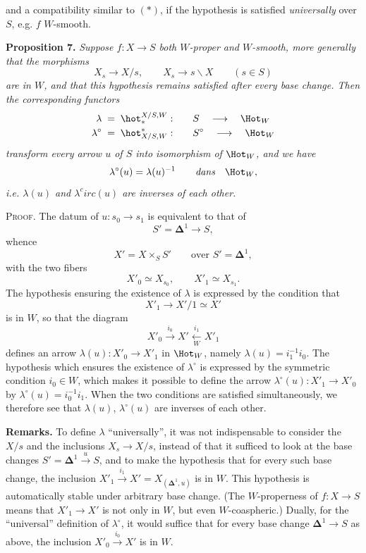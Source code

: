 \leavevmode{}and a compatibility similar to $(*)$, if the hypothesis is satisfied \textit{universally} over $S$, e.g. $f$ $W$-smooth.

\textbf{Proposition 7.} \textit{Suppose $f : X\longrightarrow S$ both $W$-proper and $W$-smooth, more generally that the morphisms}
\[
X_s\longrightarrow X/s,\qquad X_s\longrightarrow s\backslash X\qquad(s\in S)
\]
\textit{are in $W$, and that this hypothesis remains satisfied after every base change. Then the corresponding functors} %
\[
\begin{aligned}
\lambda &\;=\;\hot_*^{X/S,W} : &&\quad S \quad\longrightarrow\quad \Hot_W\\
\lambda^\circ &\;=\;\hot^*_{X/S,W} : &&\quad S^\circ \quad\longrightarrow\quad \Hot_W
\end{aligned}
\]
\textit{transform every arrow $u$ of $S$ into} \textit{isomorphism of} $\Hot_W$\textit{, and we have}
\[
\lambda^\circ(u)=\lambda(u)^{-1}\qquad\textit{dans}\quad\Hot_W,
\]
\textit{i.e. $\lambda(u)$ and $\lambda^c irc(u)$ are inverses of each other.} %

\textsc{Proof}. The datum of $u : s_0\longrightarrow s_1$ is equivalent to that of
\[
S'=\mathbf{\Delta}^1\longrightarrow S,
\]
whence
\[
X'=X\times_S S'\qquad\text{over } S'=\mathbf{\Delta}^1,
\]
with the two fibers
\[
X'_0\simeq X_{s_0},\qquad X'_1\simeq X_{s_1}.
\]
The hypothesis ensuring the existence of $\lambda$ is expressed by the condition that
\[
X'_1\longrightarrow X'/1\simeq X'
\]
is in $W$, so that the diagram
\[
X'_0\xrightarrow{i_0}X'\xleftarrow[W]{i_1}X'_1
\]
defines an arrow $\lambda(u) : X'_0\longrightarrow X'_1$ in $\Hot_W$, namely $\lambda(u)=i_1^{-1}i_0$. The hypothesis which ensures the existence of $\lambda^\circ$ is expressed by the symmetric condition $i_0\in W$, which makes it possible to define the arrow $\lambda^\circ(u) : X'_1\longrightarrow X'_0$ by $\lambda^\circ(u)=i_0^{-1}i_1$. When the two conditions are satisfied simultaneously, we therefore see that $\lambda(u)$, $\lambda^\circ(u)$ are inverses of each other.

\textbf{Remarks.} To define $\lambda$ ``universally'', it was not indispensable to consider the $X/s$ and the inclusions $X_s\longrightarrow X/s$, instead of that it sufficed to look at the base changes $S'=\mathbf{\Delta}^1\xrightarrow{u}S$, and to make the hypothesis that for every such base change, the inclusion $X'_1\xrightarrow{i_1}X'=X_{(\mathbf{\Delta}^1,u)}$ is in $W$. This hypothesis is automatically stable under arbitrary base change. (The $W$-properness of $f : X\longrightarrow S$ means that $X'_1\longrightarrow X'$ is not only in $W$, but even $W$-coaspheric.) Dually, for the ``universal'' definition of $\lambda^\circ$, it would suffice that for every base change $\mathbf{\Delta}^1\longrightarrow S$ as above, the inclusion $X'_0\xrightarrow{i_0}X'$ is in $W$.

